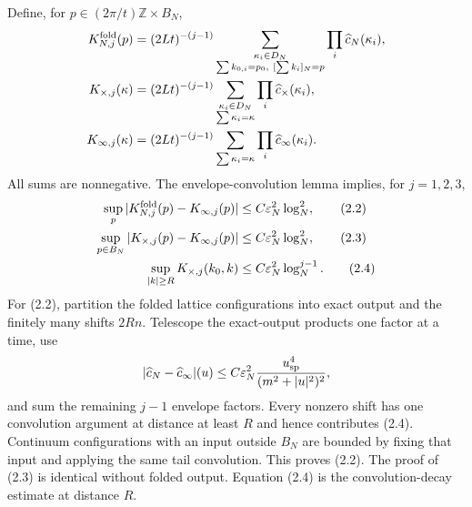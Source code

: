 \documentclass[11pt,a4paper]{article}
\begin{document}
Define, for $p\in (2\pi/t)\mathbb Z\times B_N$,
\begin{align*}
 K_{N,j}^{\rm fold}(p)
 &=(2Lt)^{-(j-1)}
 \sum_{\substack{\kappa_i\in D_N\\
 \sum k_{0,i}=p_0,\ [\sum k_i]_N=p}}
 \prod_i\widehat c_N(\kappa_i),\\
 K_{\times,j}(\kappa)
 &=(2Lt)^{-(j-1)}
 \sum_{\substack{\kappa_i\in D_N\\\sum\kappa_i=\kappa}}
 \prod_i\widehat c_\times(\kappa_i),\\
 K_{\infty,j}(\kappa)
 &=(2Lt)^{-(j-1)}
 \sum_{\sum\kappa_i=\kappa}\prod_i\widehat c_\infty(\kappa_i).
\end{align*}
All sums are nonnegative.  The envelope-convolution lemma implies, for
$j=1,2,3$,
\begin{align}
 \sup_p|K_{N,j}^{\rm fold}(p)-K_{\infty,j}(p)|
 &\le C\varepsilon_N^2\log_N^2,\tag{2.2}\\
 \sup_{p\in B_N}|K_{\times,j}(p)-K_{\infty,j}(p)|
 &\le C\varepsilon_N^2\log_N^2,\tag{2.3}\\
 \sup_{|k|\ge R}K_{\times,j}(k_0,k)
 &\le C\varepsilon_N^2\log_N^{j-1}.\tag{2.4}
\end{align}
For (2.2), partition the folded lattice configurations into exact output and the
finitely many shifts $2Rn$.  Telescope the exact-output products one factor at a time,
use
\[
 |\widehat c_N-\widehat c_\infty|(u)
 \le C\varepsilon_N^2\frac{u_{\rm sp}^4}{(m^2+|u|^2)^2},
\]
and sum the remaining $j-1$ envelope factors.  Every nonzero shift has one convolution
argument at distance at least $R$ and hence contributes (2.4).  Continuum configurations
with an input outside $B_N$ are bounded by fixing that input and applying the same tail
convolution.  This proves (2.2).  The proof of (2.3) is identical without folded output.
Equation (2.4) is the convolution-decay estimate at distance $R$.
\end{document}
